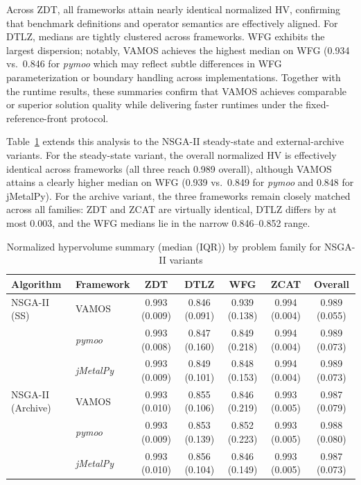 \documentclass[final,5p,times,twocolumn]{elsarticle}
\newcommand{\VAMOS}{VAMOS}
\begin{document}
Across ZDT, all frameworks attain nearly identical normalized HV, confirming that benchmark definitions and operator semantics are effectively aligned. For DTLZ, medians are tightly clustered across frameworks. WFG exhibits the largest dispersion; notably, \VAMOS{} achieves the highest median on WFG (0.934 vs.\ 0.846 for \textit{pymoo}\revision{),} which may reflect subtle differences in WFG parameterization or boundary handling across implementations. Together with the runtime results, these summaries confirm that \VAMOS{} achieves comparable or superior solution quality while delivering faster runtimes under the fixed-reference-front protocol.

Table~\ref{tab:frameworks_hv_variants} extends this analysis to the NSGA-II steady-state and external-archive variants. For the steady-state variant, the overall normalized HV is effectively identical across frameworks (all three reach 0.989 overall), although \VAMOS{} attains a clearly higher median on WFG (0.939 vs.\ 0.849 for \textit{pymoo} and 0.848 for jMetalPy). For the archive variant, the three frameworks remain closely matched across all families: ZDT and ZCAT are virtually identical, DTLZ differs by at most 0.003, and the WFG medians lie in the narrow 0.846--0.852 range.

\begin{table}[htbp]
\centering
\caption{Normalized hypervolume summary (median (IQR)) by problem family for NSGA-II variants}
\label{tab:frameworks_hv_variants}
\begin{tabular}{@{}llccccc@{}}
\toprule
\textbf{Algorithm} & \textbf{Framework} & \textbf{ZDT} & \textbf{DTLZ} & \textbf{WFG} & \textbf{ZCAT} & \textbf{Overall} \\
\midrule
NSGA-II (SS) & VAMOS & 0.993 (0.009) & 0.846 (0.091) & 0.939 (0.138) & 0.994 (0.004) & 0.989 (0.055) \\
 & \textit{pymoo} & 0.993 (0.008) & 0.847 (0.160) & 0.849 (0.218) & 0.994 (0.004) & 0.989 (0.073) \\
 & \textit{jMetalPy} & 0.993 (0.009) & 0.849 (0.101) & 0.848 (0.153) & 0.994 (0.004) & 0.989 (0.073) \\
\midrule
NSGA-II (Archive) & VAMOS & 0.993 (0.010) & 0.855 (0.106) & 0.846 (0.219) & 0.993 (0.005) & 0.987 (0.079) \\
 & \textit{pymoo} & 0.993 (0.009) & 0.853 (0.139) & 0.852 (0.223) & 0.993 (0.005) & 0.988 (0.080) \\
 & \textit{jMetalPy} & 0.993 (0.010) & 0.856 (0.104) & 0.846 (0.149) & 0.993 (0.005) & 0.987 (0.073) \\
\bottomrule
\end{tabular}
\end{table}
\end{document}
